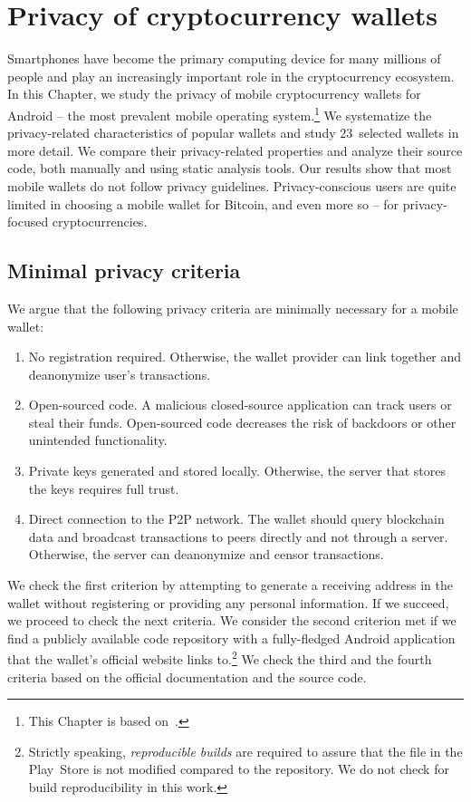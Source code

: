 \chapter{Privacy of cryptocurrency wallets}

\label{Chapter04Wallets}

Smartphones have become the primary computing device for many millions of people and play an increasingly important role in the cryptocurrency ecosystem.
In this Chapter, we study the privacy of mobile cryptocurrency wallets for Android -- the most prevalent mobile operating system.\footnote{This Chapter is based on~\cite{Biryukov2019}.}
We systematize the privacy-related characteristics of popular wallets and study $23$~selected wallets in more detail.
We compare their privacy-related properties and analyze their source code, both manually and using static analysis tools.
Our results show that most mobile wallets do not follow privacy guidelines.
Privacy-conscious users are quite limited in choosing a mobile wallet for Bitcoin, and even more so -- for privacy-focused cryptocurrencies.


\section{Minimal privacy criteria} \label{section:Ch04Initialprivacycriteria}

We argue that the following privacy criteria are minimally necessary for a mobile wallet:
\begin{enumerate}
	\item No registration required. Otherwise, the wallet provider can link together and deanonymize user's transactions. 
	\item Open-sourced code. A malicious closed-source application can track users or steal their funds. Open-sourced code decreases the risk of backdoors or other unintended functionality. 
	\item Private keys generated and stored locally. Otherwise, the server that stores the keys requires full trust.
	\item Direct connection to the P2P network. The wallet should query blockchain data and broadcast transactions to peers directly and not through a server. Otherwise, the server can deanonymize and censor transactions.
\end{enumerate}
We check the first criterion by attempting to generate a receiving address in the wallet without registering or providing any personal information.
If we succeed, we proceed to check the next criteria.
We consider the second criterion met if we find a publicly available code repository with a fully-fledged Android application that the wallet's official website links to.\footnote{Strictly speaking, \textit{reproducible builds} are required to assure that the file in the Play~Store is not modified compared to the repository. We do not check for build reproducibility in this work.}
We check the third and the fourth criteria based on the official documentation and the source code.

